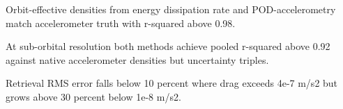 \documentclass[draft]{agujournal2019}
\begin{document}


\begin{keypoints}
\item Orbit-effective densities from energy dissipation rate and POD-accelerometry match accelerometer truth with r-squared above 0.98.
\item At sub-orbital resolution both methods achieve pooled r-squared above 0.92 against native accelerometer densities but uncertainty triples.
\item Retrieval RMS error falls below 10 percent where drag exceeds 4e-7 m/s2 but grows above 30 percent below 1e-8 m/s2.
\end{keypoints}

%
%

%
%

\end{document}
